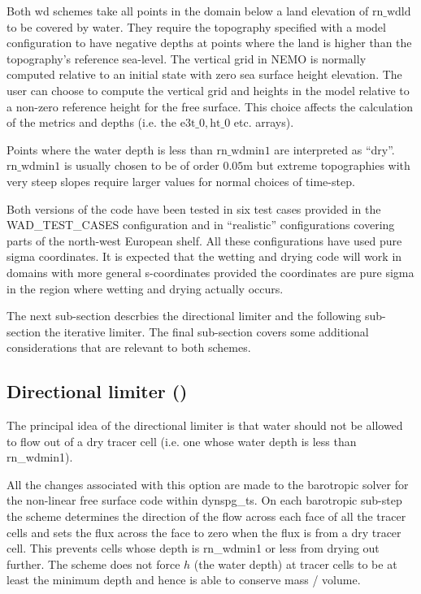 Both wd schemes take all points in the domain below a land elevation of $\mathrm{rn\_wdld}$ to be
covered by water. They require the topography specified with a model
configuration to have negative depths at points where the land is higher than the
topography's reference sea-level. The vertical grid in NEMO is normally computed relative to an
initial state with zero sea surface height elevation. 
The user can choose to compute the vertical grid and heights in the model relative to 
a non-zero reference height for the free surface. This choice affects the calculation of the metrics and depths
(i.e. the $\mathrm{e3t\_0, ht\_0}$ etc. arrays). 

Points where the water depth is less than $\mathrm{rn\_wdmin1}$ are interpreted as ``dry''. 
$\mathrm{rn\_wdmin1}$ is usually chosen to be of order $0.05$m but extreme topographies 
with very steep slopes require larger values for normal choices of time-step. 

Both versions of the code have been tested in six test cases provided in the WAD\_TEST\_CASES configuration
and in ``realistic'' configurations covering parts of the north-west European shelf. 
All these configurations have used pure sigma coordinates. It is expected that
the wetting and drying code will work in domains with more general s-coordinates provided
the coordinates are pure sigma in the region where wetting and drying actually occurs.  

The next sub-section descrbies the directional limiter and the following sub-section the iterative limiter. 
The final sub-section covers some additional considerations that are relevant to both schemes. 

\subsection   [Directional limiter (\textit{wet\_dry})]
			{Directional limiter ()}
\label{DYN_wd_directional_limiter}

The principal idea of the directional limiter is that 
water should not be allowed to flow out of a dry tracer cell (i.e. one whose water depth is less than rn\_wdmin1).

All the changes associated with this option are made to the barotropic solver for the non-linear 
free surface code within dynspg\_ts. 
On each barotropic sub-step the scheme determines the direction of the flow across each face of all the tracer cells
and sets the flux across the face to zero when the flux is from a dry tracer cell. This prevents cells
whose depth is rn\_wdmin1 or less from drying out further. The scheme does not force $h$ (the water depth) at tracer cells
to be at least the minimum depth and hence is able to conserve mass / volume. 


